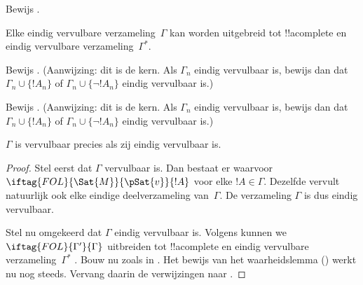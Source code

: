 \documentclass[openany]{memoir}
\begin{document}
\begin{prob}
Bewijs .
\end{prob}
\tagendprob

\begin{lem}
 Elke eindig vervulbare verzameling~$\Gamma$
kan worden uitgebreid tot !!a{complete} en eindig vervulbare
verzameling~$\Gamma^*$.
\end{lem}

\begin{prob}
Bewijs . (Aanwijzing: dit is de
kern. Als $\Gamma_n$ eindig vervulbaar is, bewijs dan dat
$\Gamma_n \cup \{!A_n\}$ of $\Gamma_n \cup \{\lnot !A_n\}$ eindig
vervulbaar is.)
\end{prob}
\tagendprob

\begin{prob}
Bewijs . (Aanwijzing: dit is de
kern. Als $\Gamma_n$ eindig vervulbaar is, bewijs dan dat
$\Gamma_n \cup \{!A_n\}$ of $\Gamma_n \cup \{\lnot !A_n\}$ eindig
vervulbaar is.)
\end{prob}
\tagendprob

\begin{thm}[Compactheid]
 $\Gamma$ is vervulbaar precies als zij
eindig vervulbaar is.
\end{thm}

\begin{proof}
Stel eerst dat $\Gamma$ vervulbaar is. Dan bestaat er
waarvoor $\iftag{FOL}{\Sat{M}}{\pSat{v}}{!A}$ voor elke $!A \in \Gamma$.
Dezelfde  vervult natuurlijk ook
elke eindige deelverzameling van~$\Gamma$. De verzameling $\Gamma$ is dus
eindig vervulbaar.

Stel nu omgekeerd dat $\Gamma$ eindig vervulbaar is. Volgens
 kunnen we $\iftag{FOL}{\Gamma'}{\Gamma}$
uitbreiden tot !!a{complete} en eindig vervulbare verzameling~$\Gamma^*$
.
Bouw nu 
zoals in . Het bewijs van het waarheidslemma
() werkt nu nog steeds. Vervang daarin de
verwijzingen naar .
\end{proof}
\end{document}
